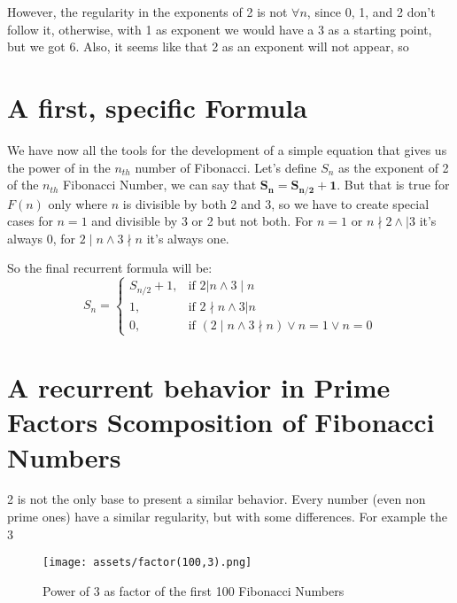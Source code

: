 \documentclass[amsmath,amssymb,aps,pra,reprint,groupedaddress,showpacs]{revtex4-1}
\begin{document}
However, the regularity in the exponents of 2 is not $\forall n$, since 0, 1, and 2 don't follow it,
otherwise, with 1 as exponent we would have a 3 as a starting point, but we got 6. Also, it seems like that 2 as an exponent will not appear,
so 

\section{A first, specific Formula}

We have now all the tools for the development of a simple equation that gives us the power of in the $n_{th}$ number of Fibonacci. Let's define $S_n$ as the exponent of 2 of the $n_{th}$ Fibonacci Number, 
we can say that $\mathbf{S_n = S_{n/2} + 1}$. But that is true for $F(n)$ only where $n$ is divisible by both 2 and 3, so we have to create special cases for
$n=1$ and divisible by 3 or 2 but not both. For $n = 1$ or $n \nmid 2 \land \mid 3 $ it's always 0, for $2 \mid n \land 3 \nmid n $ it's always one.

So the final recurrent formula will be: 
$$S_n = \begin{cases} S_{n/2} + 1, & \mbox{if }2|n \land 3 \mid n \\ 1, & \mbox{if } 2 \nmid n \land 3|n \\ 0, & \mbox{if } \left( 2 \mid n \land 3 \nmid n \right) \lor n = 1 \lor n = 0
\end{cases} $$


\section{A recurrent behavior in Prime Factors Scomposition of Fibonacci Numbers}

2 is not the only base to present a similar behavior. Every number (even non prime ones) have a similar regularity, but with some differences.
For example the 3

\begin{figure}[H]
\centering
\texttt{[image: assets/factor(100,3).png]} %
\caption{Power of 3 as factor of the first 100 Fibonacci Numbers}
\end{figure}
\end{document}
